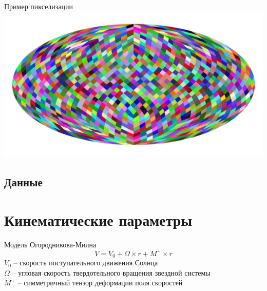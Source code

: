 \documentclass{beamer}
\begin{document}
\begin{frame}{Пример пикселизации}
\includegraphics[width=1\linewidth]{healpexample.jpg}
\end{frame}
\subsection{Данные}

\section{Кинематические параметры}
\begin{frame}{Модель Огородникова-Милна}
\begin{equation}\label{ogorod}
V=V_0+\Omega\times r+M^+\times r
\end{equation}
$V_0$ -- скорость поступательного движения Солнца\\ $\Omega$ -- угловая скорость твердотельного вращения звездной системы \\$M^+$ -- симметричный тензор деформации поля скоростей
\end{frame}

\end{document}
